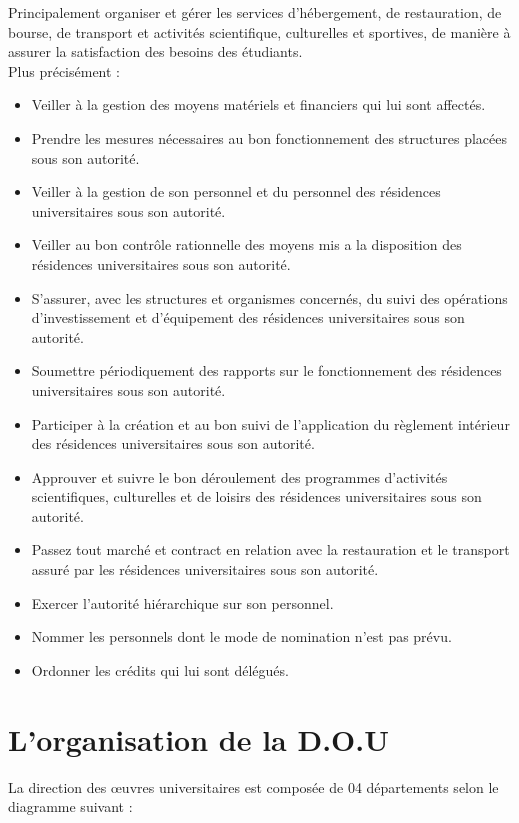     Principalement organiser et gérer les services d'hébergement, de restauration, de bourse, de transport et activités scientifique, culturelles et sportives, de manière à assurer la satisfaction des besoins des étudiants.\\
    
    Plus précisément :
    
    \begin{itemize}\renewcommand{\labelitemi}{$\bullet$}
        \item Veiller à la gestion des moyens matériels et financiers qui lui sont affectés.
        \item Prendre les mesures nécessaires au bon fonctionnement des structures placées sous son autorité.
        \item Veiller à la gestion de son personnel et du personnel des résidences universitaires sous son autorité.
        \item Veiller au bon contrôle rationnelle des moyens mis a la disposition des résidences universitaires sous son autorité.
        \item S'assurer, avec les structures et organismes concernés, du suivi des opérations d'investissement et d'équipement des résidences universitaires sous son autorité.
        \item Soumettre périodiquement des rapports sur le fonctionnement des résidences universitaires sous son autorité.
        \item Participer à la création et au bon suivi de l'application du règlement intérieur des résidences universitaires sous son autorité.
        \item Approuver et suivre le bon déroulement des programmes d'activités scientifiques, culturelles et de loisirs des résidences universitaires sous son autorité.
        \item Passez tout marché et contract en relation avec la restauration et le transport assuré par les résidences universitaires sous son autorité.
        \item Exercer l'autorité hiérarchique sur son personnel.
        \item Nommer les personnels dont le mode de nomination n'est pas prévu.
        \item Ordonner les crédits qui lui sont délégués.
    \end{itemize}

\section{L’organisation de la \acs{D.O.U} \cite{onou-arrete}}
    La direction des œuvres universitaires est composée de 04 départements selon le diagramme suivant :

